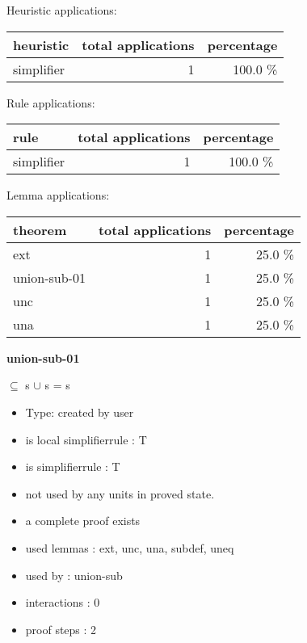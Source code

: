 \documentclass[a4paper]{article}
\begin{document}
\medskip


Heuristic applications:

\begin{supertabular}{l|r|r}
heuristic	& total applications & percentage \\ \hline
simplifier & 1 & 100.0 \% \\

\end{supertabular}

Rule applications:

\begin{supertabular}{l|r|r}
rule	        & total applications & percentage \\ \hline
simplifier & 1 & 100.0 \% \\

\end{supertabular}

Lemma applications:

\begin{supertabular}{l|r|r}
theorem	        & total applications & percentage \\ \hline
ext & 1 & 25.0 \% \\
union-sub-01 & 1 & 25.0 \% \\
unc & 1 & 25.0 \% \\
una & 1 & 25.0 \% \\

\end{supertabular}
\pagebreak

{\LARGE\bf union-sub-01}\label{lemma-union-sub-01}

\medskip

 \Fol {} $\subseteq$ s \Imp {} $\cup$ s = s

\begin{itemize}

\item Type: created by user

\item is local simplifierrule : T
\item is simplifierrule : T
\item not used by any units in proved state.
\item       a complete proof exists
\item       used lemmas  : ext, unc, una, subdef, uneq
\item       used by      : union-sub
\item       interactions : 0
\item       proof steps  : 2
\end{itemize}
\end{document}
